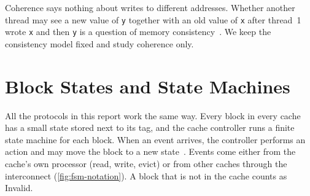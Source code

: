 Coherence says nothing about writes to different addresses. Whether another
thread may see a new value of \texttt{y} together with an old value of \texttt{x}
after thread~1 wrote \texttt{x} and then \texttt{y} is a question of memory
consistency~\cite[\S12.4.3]{sarangi2025basic}. We keep the consistency model fixed
and study coherence only.

\section{Block States and State Machines}
\label{sec:coh-fsm}

All the protocols in this report work the same way. Every block in every cache
has a small state stored next to its tag, and the cache controller runs a finite
state machine for each block. When an event arrives, the controller performs an
action and may move the block to a new state~\cite[\S12.4.6]{sarangi2025basic}.
Events come either from the cache's own processor (read, write, evict) or from
other caches through the interconnect (\cref{fig:fsm-notation}). A block that is
not in the cache counts as Invalid.

